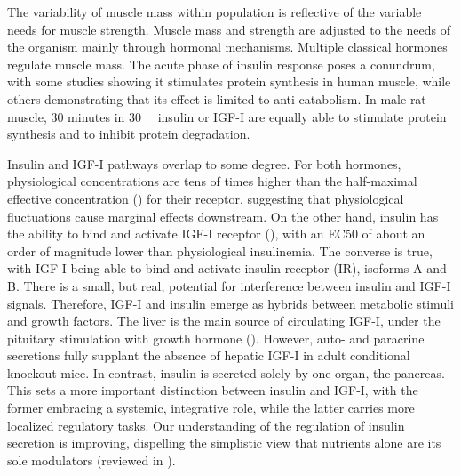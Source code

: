 \documentclass[12pt,english]{report}\usepackage[]{graphicx}\usepackage[]{color}
\begin{document}
The variability of muscle mass within population is reflective of
the variable needs for muscle strength. Muscle mass and strength are
adjusted to the needs of the organism mainly through hormonal mechanisms.
Multiple classical hormones regulate muscle mass. The acute phase
of insulin response poses a conundrum, with some studies showing it
stimulates protein synthesis in human muscle\citep{biolo1995physiologic},
while others demonstrating that its effect is limited to anti-catabolism\citep{chow2006mechanism}.
In male rat muscle, 30 minutes in \SI{30}{\nano\molar} insulin or
IGF-I are equally able to stimulate protein synthesis and to inhibit
protein degradation\citep{dardevet1998glucocorticoid}.

Insulin and IGF-I pathways overlap to some degree. For both hormones,
physiological concentrations are tens of times higher than the half-maximal
effective concentration ()
for their receptor, suggesting that physiological fluctuations cause
marginal effects downstream\citep{soos1990receptors,pandini2002insulin/insulin-like}.
On the other hand, insulin has the ability to bind and activate IGF-I
receptor (), with an EC50 of
about an order of magnitude lower than physiological insulinemia.
The converse is true, with IGF-I being able to bind and activate insulin
receptor (IR), isoforms A and B. There is a small, but real, potential
for interference between insulin and IGF-I signals. Therefore, IGF-I
and insulin emerge as hybrids between metabolic stimuli and growth
factors. The liver is the main source of circulating IGF-I, under
the pituitary stimulation with growth hormone ().
However, auto- and paracrine secretions fully supplant the absence
of hepatic IGF-I in adult conditional knockout mice\citep{sjogren1999liver-derived}.
In contrast, insulin is secreted solely by one organ, the pancreas.
This sets a more important distinction between insulin and IGF-I,
with the former embracing a systemic, integrative role, while the
latter carries more localized regulatory tasks. Our understanding
of the regulation of insulin secretion is improving, dispelling the
simplistic view that nutrients alone are its sole modulators (reviewed
in \citep{rorsman2013regulation}).
\end{document}

